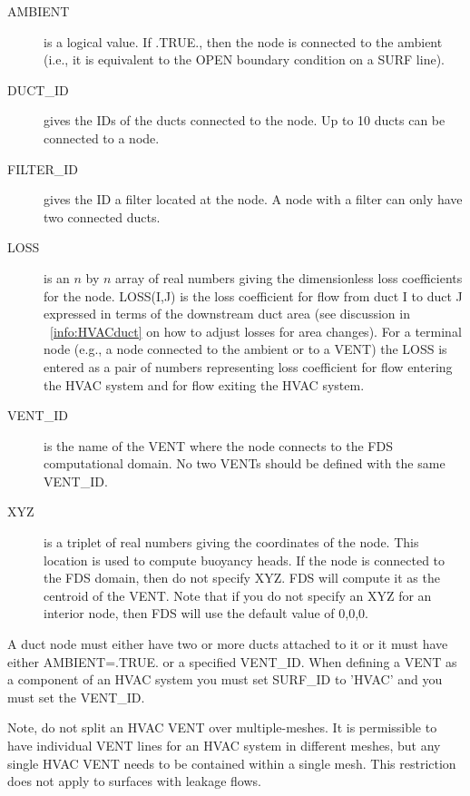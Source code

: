 \documentclass[11pt]{book}
\begin{document}
\begin{description}
\item[{\ct AMBIENT}] is a logical value.  If {\ct .TRUE.}, then the node is connected to the ambient (i.e., it is equivalent to the {\ct OPEN} boundary condition on a {\ct SURF} line).
\item[{\ct DUCT\_ID}] gives the {\ct ID}s of the ducts connected to the node.  Up to 10 ducts can be connected to a node.
\item[{\ct FILTER\_ID}] gives the {\ct ID} a filter located at the node.  A node with a filter can only have two connected ducts.
\item[{\ct LOSS}] is an $n$ by $n$ array of real numbers giving the dimensionless loss coefficients for the node.  {\ct LOSS(I,J)} is the loss coefficient for flow from duct {\ct I} to duct {\ct J} expressed in terms of the downstream duct area (see discussion in ~\ref{info:HVACduct} on how to adjust losses for area changes).  For a terminal node (e.g., a node connected to the ambient or to a {\ct VENT}) the {\ct LOSS} is entered as a pair of numbers representing loss coefficient for flow entering the HVAC system and for flow exiting the HVAC system.
\item[{\ct VENT\_ID}] is the name of the {\ct VENT} where the node connects to the FDS computational domain.  No two {\ct VENTs} should be defined with the same {\ct VENT\_ID}.
\item[{\ct XYZ}] is a triplet of real numbers giving the coordinates of the node.  This location is used to compute buoyancy heads.
If the node is connected to the FDS domain, then do not specify {\ct XYZ}.  FDS will compute it as the centroid of the {\ct VENT}. Note that if you do not specify an {\ct XYZ} for an interior node, then FDS will use the default value of 0,0,0.
\end{description}

\noindent
A duct node must either have two or more ducts attached to it or it must have either {\ct AMBIENT=.TRUE.} or a specified {\ct VENT\_ID}.  When defining a {\ct VENT} as a component of an HVAC system you must set {\ct SURF\_ID} to {\ct 'HVAC'} and you must set the {\ct VENT\_ID}.

Note, do not split an HVAC {\ct VENT} over multiple-meshes. It is permissible to have individual {\ct VENT} lines for an HVAC system in different meshes, but any single HVAC {\ct VENT} needs to be contained within a single mesh. This restriction does not apply to surfaces with leakage flows.
\end{document}
